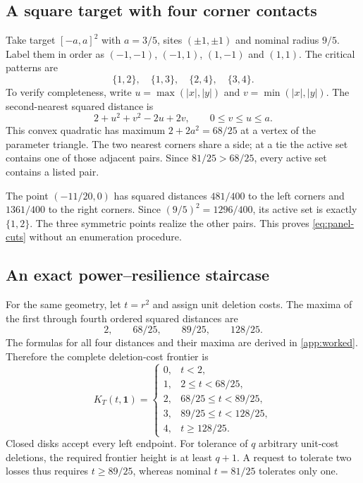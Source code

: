 \subsection{A square target with four corner contacts}
Take target $[-a,a]^2$ with $a=3/5$, sites $(\pm1,\pm1)$ and nominal radius $9/5$. Label them in order as $(-1,-1)$, $(-1,1)$, $(1,-1)$ and $(1,1)$. The critical patterns are
\begin{equation}\label{eq:panel-cuts}
\{1,2\},\quad\{1,3\},\quad\{2,4\},\quad\{3,4\}.
\end{equation}
To verify completeness, write $u=\max(|x|,|y|)$ and $v=\min(|x|,|y|)$. The second-nearest squared distance is
\[
2+u^2+v^2-2u+2v,\qquad 0\le v\le u\le a.
\]
This convex quadratic has maximum $2+2a^2=68/25$ at a vertex of the parameter triangle. The two nearest corners share a side; at a tie the active set contains one of those adjacent pairs. Since $81/25>68/25$, every active set contains a listed pair.

The point $(-11/20,0)$ has squared distances $481/400$ to the left corners and $1361/400$ to the right corners. Since $(9/5)^2=1296/400$, its active set is exactly $\{1,2\}$. The three symmetric points realize the other pairs. This proves \cref{eq:panel-cuts} without an enumeration procedure.

\subsection{An exact power--resilience staircase}
For the same geometry, let $t=r^2$ and assign unit deletion costs. The maxima of the first through fourth ordered squared distances are
\[
2,\qquad68/25,\qquad89/25,\qquad128/25.
\]
The formulas for all four distances and their maxima are derived in \cref{app:worked}. Therefore the complete deletion-cost frontier is
\begin{equation}\label{eq:panel-staircase}
K_T(t,\mathbf1)=
\begin{cases}
0,&t<2,\\
1,&2\le t<68/25,\\
2,&68/25\le t<89/25,\\
3,&89/25\le t<128/25,\\
4,&t\ge128/25.
\end{cases}
\end{equation}
Closed disks accept every left endpoint. For tolerance of $q$ arbitrary unit-cost deletions, the required frontier height is at least $q+1$. A request to tolerate two losses thus requires $t\ge89/25$, whereas nominal $t=81/25$ tolerates only one.

